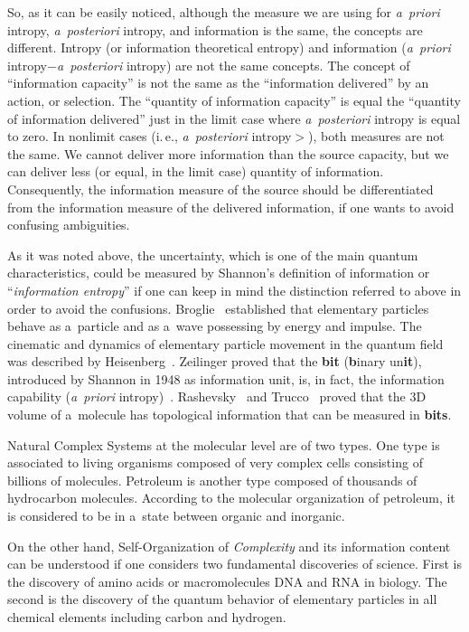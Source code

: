 \begin{multicols}{2}
So, as it can be easily noticed, although the measure we are using for \textit{a~priori} intropy, 
\textit{a~posteriori} intropy, and information is the same, the concepts are different. Intropy (or 
information theoretical entropy) and information (\textit{a~priori} intropy\;$-$\;\textit{a~posteriori} 
intropy) are 
not the same concepts. The concept of ``information capacity'' is not the same as 
the ``information delivered'' by an action, or selection. The ``quantity
of information capacity'' is equal the ``quantity of information delivered'' just in the limit 
case where \textit{a~posteriori} intropy is equal to zero. In nonlimit cases (i.\,e.,
\textit{a~posteriori} intropy\;$>$), both measures are not the same. We cannot deliver more information than the source 
capacity, but we can deliver less (or equal, in the limit case) quantity of information. 
Consequently,  the information measure of the source should be differentiated from the 
information measure of the delivered information, if one wants to avoid confusing 
ambiguities. 

As it was noted above, the uncertainty, which is one of the main quantum characteristics, could be 
measured by Shannon's definition of information or ``\textit{information entropy}'' if 
one can 
keep in mind the distinction referred to above in order to avoid the confusions. 
Broglie~\cite{15-sel} 
established that elementary particles behave as a~particle and as a~wave possessing by energy and 
impulse. The cinematic and dynamics of elementary particle movement in the quantum field was 
described by Heisenberg~\cite{4-sel}. Zeilinger proved that the \textbf{bit} (\textbf{b}inary 
un\textbf{it}), introduced by Shannon in 1948 as information unit, is, in fact, the information 
capability (\textit{a~priori} intropy)~\cite{5-sel}. Rashevsky~\cite{16-sel} and Trucco~\cite{17-sel} proved that the 3D 
volume of a~molecule has topological information that can be measured in \textbf{bits}. 

Natural Complex Systems at the molecular level are of two types. One type is associated to 
living organisms composed of very complex cells consisting of billions of molecules. Petroleum 
is another type composed of thousands of hydrocarbon molecules. According to the molecular 
organization of petroleum, it is considered to be in a~state between organic and inorganic.

On the other hand, Self-Organization of \textit{Complexity} and its information content can be 
understood if one considers two fundamental discoveries of science. First is the discovery of 
amino acids or macromolecules DNA and RNA in biology. The second is the discovery of the 
quantum behavior of elementary particles in all chemical elements including carbon and 
hydrogen.


\end{multicols}
